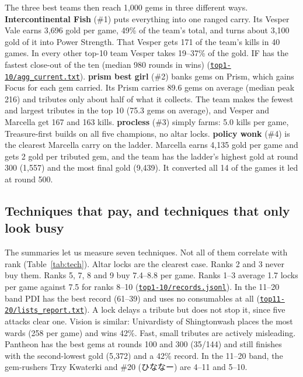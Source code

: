 \documentclass[11pt,a4paper]{article}
\newcommand{\scratch}{file:///private/tmp/claude-501/-Users-tristanbasri-Desktop-Code-cambridge-battlecode-s2/b3f4cb6b-e46a-405f-957c-42c44c05c8dc/scratchpad/ladder-data}
\newcommand{\src}[2]{{\small(\href{#1}{\textcolor{cTop}{\texttt{#2}}})}}
\begin{document}
The three best teams then reach 1,000 gems in three different ways. \textbf{Intercontinental Fish} (\#1) puts everything into one ranged carry. Its Vesper Vale earns 3,696 gold per game, 49\% of the team's total, and turns about 3,100 gold of it into Power Strength. That Vesper gets 171 of the team's kills in 40 games. In every other top-10 team Vesper takes 19--37\% of the gold. IF has the fastest close-out of the ten (median 980 rounds in wins) \src{\scratch/top1-10/agg_current.txt}{top1-10/agg\_current.txt}. \textbf{prism best girl} (\#2) banks gems on Prism, which gains Focus for each gem carried. Its Prism carries 89.6 gems on average (median peak 216) and tributes only about half of what it collects. The team makes the fewest and largest tributes in the top 10 (75.3 gems on average), and Vesper and Marcella get 167 and 163 kills. \textbf{procless} (\#3) simply farms: 5.0 kills per game, Treasure-first builds on all five champions, no altar locks. \textbf{policy wonk} (\#4) is the clearest Marcella carry on the ladder. Marcella earns 4,135 gold per game and gets 2 gold per tributed gem, and the team has the ladder's highest gold at round 300 (1,557) and the most final gold (9,439). It converted all 14 of the games it led at round 500.

\subsection{Techniques that pay, and techniques that only look busy}

The summaries let us measure seven techniques. Not all of them correlate with rank (Table~\ref{tab:tech}). Altar locks are the clearest case. Ranks 2 and 3 never buy them. Ranks 5, 7, 8 and 9 buy 7.4--8.8 per game. Ranks 1--3 average 1.7 locks per game against 7.5 for ranks 8--10 \src{\scratch/top1-10/records.jsonl}{top1-10/records.jsonl}. In the 11--20 band PDI has the best record (61--39) and uses no consumables at all \src{\scratch/top11-20/lists_report.txt}{top11-20/lists\_report.txt}. A lock delays a tribute but does not stop it, since five attacks clear one. Vision is similar: Univardisty of Shingtonwash places the most wards (258 per game) and wins 42\%. Fast, small tributes are actively misleading. Pantheon has the best gems at rounds 100 and 300 (35/144) and still finishes with the second-lowest gold (5,372) and a 42\% record. In the 11--20 band, the gem-rushers Trzy Kwaterki and \#20 ({\jp ひななー}) are 4--11 and 5--10.
\end{document}

